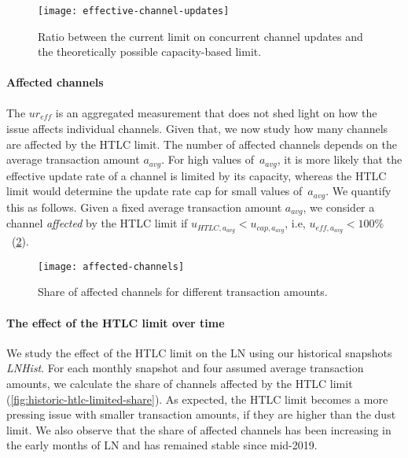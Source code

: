 \begin{figure}[tb]
	\centering
	\texttt{[image: effective-channel-updates]}
	\caption{Ratio between the current limit on concurrent channel updates and the theoretically possible capacity-based limit.}
	\label{fig:effective-channel-updates}
\end{figure}

\paragraph{Affected channels}
The $ur_\textit{eff}$ is an aggregated measurement that does not shed light on how the issue affects individual channels. 
Given that, we now study how many channels are affected by the HTLC limit.
The number of affected channels depends on the average transaction amount $a_\textit{avg}$.
For high values of~$a_\textit{avg}$, it is more likely that the effective update rate of a channel is limited by its capacity, whereas the HTLC limit would determine the update rate cap for small values of~$a_\textit{avg}$.
We quantify this as follows.
Given a fixed average transaction amount $a_\textit{avg}$, we consider a channel \textit{affected} by the HTLC limit if $u_{\textit{HTLC},a_\textit{avg}} < u_{\textit{cap},a_\textit{avg}}$, i.e, $u_{\textit{eff},a_\textit{avg}} < 100\%$~(\cref{fig:affected-channels}).

\begin{figure}[tb]
	\centering
	\texttt{[image: affected-channels]}
	\caption{Share of affected channels for different transaction amounts.}
	\label{fig:affected-channels}
\end{figure}


\paragraph{The effect of the HTLC limit over time}

We study the effect of the HTLC limit on the LN using our historical snapshots \emph{LNHist}.
For each monthly snapshot and four assumed average transaction amounts, we calculate the share of channels affected by the HTLC limit (\cref{fig:historic-htlc-limited-share}).
As expected, the HTLC limit becomes a more pressing issue with smaller transaction amounts, if they are higher than the dust limit.
We also observe that the share of affected channels has been increasing in the early months of LN and has remained stable since mid-2019.

